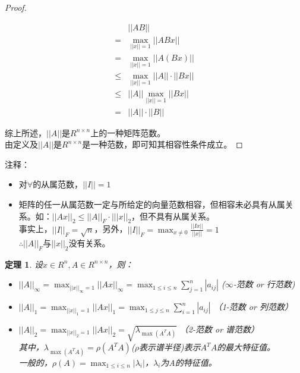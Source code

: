 \documentclass[a4paper]{article}
\newtheorem{theorem}{定理}[section]
\begin{document}
\begin{proof}
\begin{itemize}
\begin{itemize}
\begin{equation*}
\begin{split}
&||AB||\\
=& \max_{||x||=1}||ABx||\\
=&\max_{||x||=1}||A(Bx)|| \\
\le&\max_{||x||=1}||A||\cdot||Bx||\\
\le& ||A||\max_{||x||=1}||Bx|| \\
=& ||A||\cdot ||B||
\end{split}
\end{equation*}
\end{itemize}
\end{itemize}
综上所述，$||A||$是$R^{n\times n}$上的一种矩阵范数。\\
由定义及$||A||$是$R^{n\times n}$是一种范数，即可知其相容性条件成立。
\end{proof}

注释：
\begin{itemize}
\item 对$\forall $的从属范数，$||I|| = 1$
\item 矩阵的任一从属范数一定与所给定的向量范数相容，但相容未必具有从属关系。如：$||Ax||_2 \le ||A||_F\cdot |||x||_2$，但不具有从属关系。\\
事实上，$||I||_F = \sqrt{n}$，另外，$||I||_F=\max_{x \neq 0 }\frac{||Ix||}{||x||} = 1$ \\
$\therefore$$||A||_F$与$||x||_2$没有关系。
\end{itemize}

\begin{theorem}
设$x \in R^n, A \in R^{n\times n}$，则：
\begin{itemize}
\item $||A||_\infty = \max_{||x||_\infty = 1}||Ax||_\infty = \max_{1\le i \le n}\sum_{j=1}^{n}|a_{ij}|$ \hfill ($\infty$-范数 or 行范数)
\item $||A||_1 = \max_{||x||_1=1}||Ax||_1=\max_{1 \le j \le n}\sum^n_{i=1}|a_{ij}|$ \hfill （1-范数 or 列范数）
\item $||A||_2=\max_{||x||_2 = 1}||Ax||_2=\sqrt{\lambda_{\max(A^TA)}}$ \hfill （2-范数 or 谱范数）\\
其中，$\lambda_{\max(A^TA)}=\rho(A^TA)$($\rho$表示谱半径)表示$A^TA$的最大特征值。\\
一般的，$\rho(A)=\max_{1 \le i \le n}|\lambda_i|$，$\lambda_i$为A的特征值。
\end{itemize}
\end{theorem}
\end{document}
